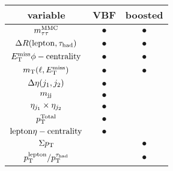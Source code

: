 \begin{tabular}{c|c|c}
variable      & VBF       & boosted   \\ 
\hline
$m_{\tau\tau}^\text{MMC}$       & $\bullet$ & $\bullet$ \\
$\Delta{}R(\mathrm{lepton}, \tau_\text{had})$         & $\bullet$ & $\bullet$ \\
$E_{\mathrm{T}}^{\mathrm{miss}} \phi-\mathrm{centrality}$ & $\bullet$ & $\bullet$ \\
$m_\text{T}(\ell, E_{\mathrm{T}}^{\mathrm{miss}})$         & $\bullet$ & $\bullet$ \\
$\deta$       & $\bullet$ &           \\
$m_{\text{jj}}$        & $\bullet$ &           \\
$\etaprod$    & $\bullet$ &           \\ 
$p_\mathrm{T}^{\mathrm{Total}}$      & $\bullet$ &           \\
$\lepetacent$ & $\bullet$ &           \\
$\Sigma p_\mathrm{T}$      &           & $\bullet$ \\
$p_\mathrm{T}^{\mathrm{lepton}}/p_\mathrm{T}^{\tau_\text{had}}$    &           & $\bullet$ \\
\end{tabular}

